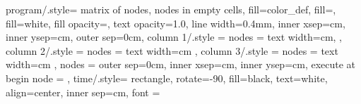 \documentclass{article}
\begin{document}
\sloppy
\pagestyle{empty}
\setlength{\parindent}{0cm} %
\frenchspacing

\small


\tikzset
{
    program/.style=
    {
        matrix of nodes,
        nodes in empty cells,
        fill=color_def,
        fill=,
        fill=white,
        fill opacity=,
        text opacity=1.0,
        line width=0.4mm,
        inner xsep=cm,
        inner ysep=cm,
        outer sep=0cm,
        column 1/.style =
        {
            nodes =
            {
                text width=cm,
            }
        },
        column 2/.style =
        {
            nodes =
            {
                text width=cm
            }
        },
        column 3/.style =
        {
            nodes =
            {
                text width=cm
            }
        },
        nodes =
        {
            outer sep=0cm,
            inner xsep=cm,
            inner ysep=cm,
            execute at begin node = 
        }
    },
    time/.style=
    {
        rectangle,
        rotate=-90,
        fill=black,
        text=white,
        align=center,
        inner sep=cm,
        font = \Large
    }
}

\end{document}
